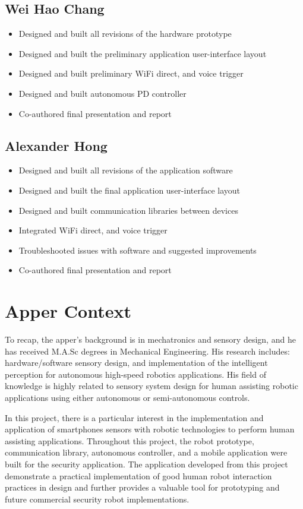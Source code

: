 \documentclass[12pt]{article}
\begin{document}
\subsection{Wei Hao Chang}
\begin{itemize}
\item Designed and built all revisions of the hardware prototype
\item Designed and built the preliminary application user-interface layout
\item Designed and built preliminary WiFi direct, and voice trigger
\item Designed and built autonomous PD controller
\item Co-authored final presentation and report
\end{itemize}
\subsection{Alexander Hong}
\begin{itemize}
\item Designed and built all revisions of the application software
\item Designed and built the final application user-interface layout
\item Designed and built communication libraries between devices
\item Integrated WiFi direct, and voice trigger
\item Troubleshooted  issues with software and suggested improvements
\item Co-authored final presentation and report
\end{itemize}

\section{Apper Context}
To recap, the apper's background is in mechatronics and sensory design, and he has received M.A.Sc degrees in Mechanical Engineering. His research includes: hardware/software sensory design, and implementation of the intelligent perception for autonomous high-speed robotics applications. His field of knowledge is highly related to sensory system design for human assisting robotic applications using either autonomous or semi-autonomous controls.

In this project, there is a particular interest in the implementation and application of smartphones sensors with robotic technologies to perform human assisting applications. Throughout this project, the robot prototype, communication library, autonomous controller, and a mobile application were built for the security application. The application developed from this project demonstrate a practical implementation of good human robot interaction practices in design and further provides a valuable tool for prototyping and future commercial security robot implementations.
\end{document}
